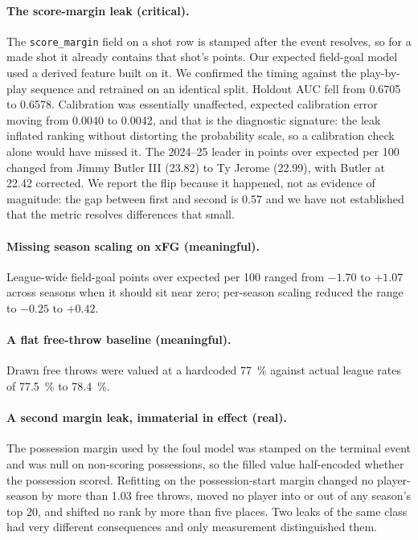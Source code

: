 \documentclass[11pt,a4paper]{article}
\begin{document}
\paragraph{The score-margin leak (critical).} The \texttt{score\_margin} field on
a shot row is stamped after the event resolves, so for a made shot it already
contains that shot's points. Our expected field-goal model used a derived feature
built on it. We confirmed the timing against the play-by-play sequence and
retrained on an identical split. Holdout AUC fell from 0.6705 to 0.6578.
Calibration was essentially unaffected, expected calibration error moving from
0.0040 to 0.0042, and that is the diagnostic signature: the leak inflated ranking
without distorting the probability scale, so a calibration check alone would have
missed it. The 2024--25 leader in points over expected per 100 changed from Jimmy
Butler III (23.82) to Ty Jerome (22.99), with Butler at 22.42 corrected. We report
the flip because it happened, not as evidence of magnitude: the gap between first
and second is 0.57 and we have not established that the metric resolves
differences that small.

\paragraph{Missing season scaling on xFG (meaningful).} League-wide field-goal
points over expected per 100 ranged from $-1.70$ to $+1.07$ across seasons when it
should sit near zero; per-season scaling reduced the range to $-0.25$ to $+0.42$.

\paragraph{A flat free-throw baseline (meaningful).} Drawn free throws were valued
at a hardcoded \SI{77}{\percent} against actual league rates of
\SI{77.5}{\percent} to \SI{78.4}{\percent}.

\paragraph{A second margin leak, immaterial in effect (real).} The possession
margin used by the foul model was stamped on the terminal event and was null on
non-scoring possessions, so the filled value half-encoded whether the possession
scored. Refitting on the possession-start margin changed no player-season by more
than 1.03 free throws, moved no player into or out of any season's top 20, and
shifted no rank by more than five places. Two leaks of the same class had very
different consequences and only measurement distinguished them.
\end{document}
